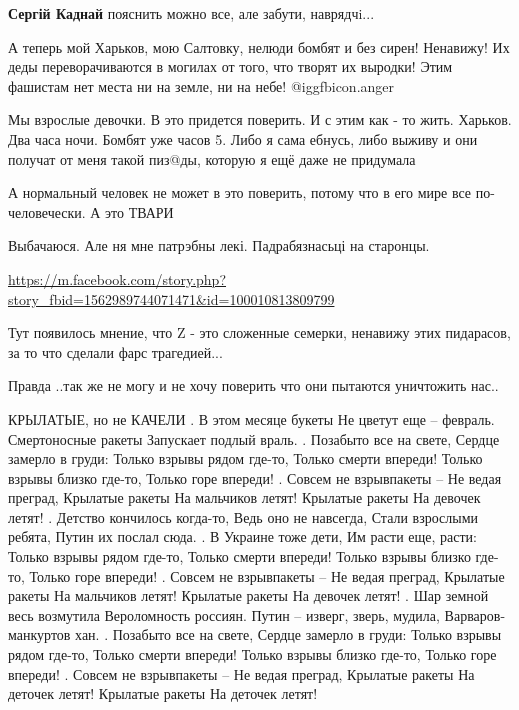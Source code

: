 \begin{itemize}
\begin{itemize}
\textbf{Сергій Каднай} пояснить можно все, але забути, наврядчi...
\end{itemize} %


А теперь мой Харьков, мою Салтовку, нелюди бомбят и без сирен! Ненавижу! Их
деды переворачиваются в могилах от того, что творят их выродки! Этим фашистам
нет места ни на земле, ни на небе! @igg{fbicon.anger} 


Мы взрослые девочки. В это придется поверить. И с этим как - то жить. Харьков.
Два часа ночи. Бомбят уже часов 5. Либо я сама ебнусь, либо выживу и они
получат от меня такой пиз@ды, которую я ещё даже не придумала

А нормальный человек не может в это поверить, потому что в его мире все по-человечески. А это ТВАРИ


Выбачаюся. Але ня мне патрэбны лекі. Падрабязнасьці на старонцы. 

\url{https://m.facebook.com/story.php?story_fbid=1562989744071471&id=100010813809799}

Тут появилось мнение, что Z - это сложенные семерки, ненавижу этих пидарасов, за то что сделали фарс трагедией...

Правда ..так же не могу и не хочу поверить что они пытаются уничтожить нас..


\raggedcolumns
\begin{multicols}{2} %
\setlength{\parindent}{0pt}

\obeycr
КРЫЛАТЫЕ, но не КАЧЕЛИ
.
В этом месяце букеты
Не цветут еще – февраль.
Смертоносные ракеты
Запускает подлый враль.
.
Позабыто все на свете,
Сердце замерло в груди:
Только взрывы рядом где-то,
Только смерти впереди!
Только взрывы близко где-то,
Только горе впереди!
.
Совсем не взрывпакеты –
Не ведая преград,
Крылатые ракеты
На мальчиков летят!
Крылатые ракеты
На девочек летят!
.
Детство кончилось когда-то,
Ведь оно не навсегда,
Стали взрослыми ребята,
Путин их послал сюда.
.
В Украине тоже дети,
Им расти еще, расти:
Только взрывы рядом где-то,
Только смерти впереди!
Только взрывы близко где-то,
Только горе впереди!
.
Совсем не взрывпакеты –
Не ведая преград,
Крылатые ракеты
На мальчиков летят!
Крылатые ракеты
На девочек летят!
.
Шар земной весь возмутила
Вероломность россиян.
Путин – изверг, зверь, мудила,
Варваров-манкуртов хан.
.
Позабыто все на свете,
Сердце замерло в груди:
Только взрывы рядом где-то,
Только смерти впереди!
Только взрывы близко где-то,
Только горе впереди!
.
Совсем не взрывпакеты –
Не ведая преград,
Крылатые ракеты
На деточек летят!
Крылатые ракеты
На деточек летят!
\restorecr
\end{multicols} %


\end{itemize} %
